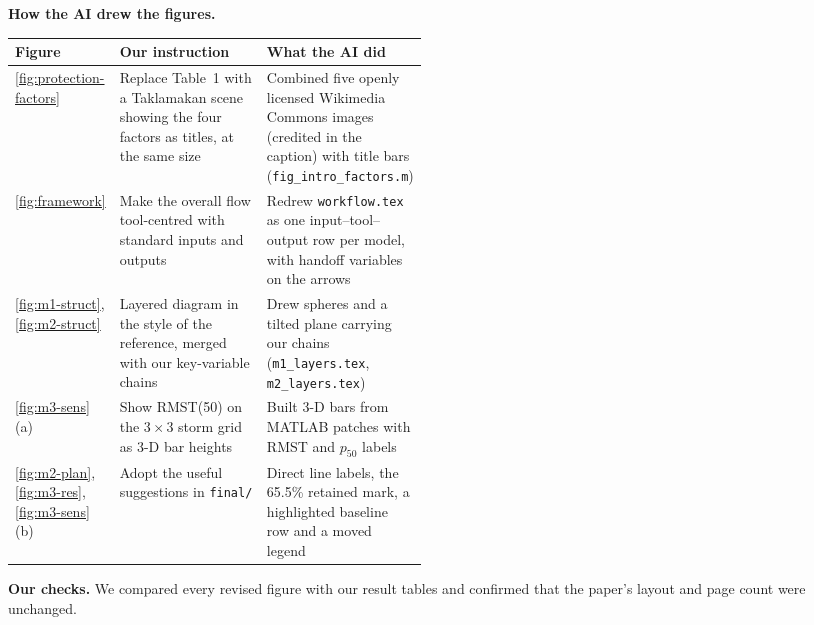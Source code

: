 \vspace{6pt}
\noindent\textbf{How the AI drew the figures.}\par
\noindent\begin{tabularx}{\linewidth}{@{}>{\raggedright\arraybackslash}p{0.12\linewidth}>{\raggedright\arraybackslash}p{0.36\linewidth}>{\raggedright\arraybackslash}X@{}}
\toprule
\textbf{Figure} & \textbf{Our instruction} & \textbf{What the AI did} \\ \midrule
\ref{fig:protection-factors} & Replace Table~1 with a Taklamakan scene showing the four factors as titles, at the same size & Combined five openly licensed Wikimedia Commons images (credited in the caption) with title bars (\texttt{fig\_intro\_factors.m}) \\
\ref{fig:framework} & Make the overall flow tool-centred with standard inputs and outputs & Redrew \texttt{workflow.tex} as one input--tool--output row per model, with handoff variables on the arrows \\
\ref{fig:m1-struct}, \ref{fig:m2-struct} & Layered diagram in the style of the reference, merged with our key-variable chains & Drew spheres and a tilted plane carrying our chains (\texttt{m1\_layers.tex}, \texttt{m2\_layers.tex}) \\
\ref{fig:m3-sens}(a) & Show RMST(50) on the $3\times3$ storm grid as 3-D bar heights & Built 3-D bars from MATLAB patches with RMST and $p_{50}$ labels \\
\ref{fig:m2-plan}, \ref{fig:m3-res}, \ref{fig:m3-sens}(b) & Adopt the useful suggestions in \texttt{final/} & Direct line labels, the 65.5\% retained mark, a highlighted baseline row and a moved legend \\ \bottomrule
\end{tabularx}

\vspace{6pt}
\noindent\textbf{Our checks.} We compared every revised figure with our result tables and confirmed that the paper's layout and page count were unchanged.
\endgroup
